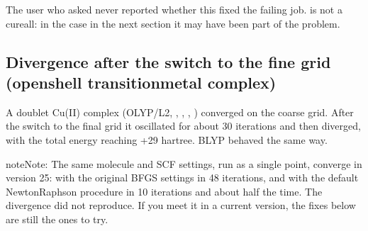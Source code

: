 \documentclass[letterpaper,10pt,english,openany,oneside]{sphinxmanual}
\begin{document}
\sphinxAtStartPar
The user who asked never reported whether this fixed the failing job.  is not a cure\sphinxhyphen{}all: in the case in the
next section it may have been part of the problem.




\subsection{Divergence after the switch to the fine grid (open\sphinxhyphen{}shell transition\sphinxhyphen{}metal complex)}
\label{\detokenize{troubleshooting/common-problems:divergence-after-the-switch-to-the-fine-grid-open-shell-transition-metal-complex}}\label{\detokenize{troubleshooting/common-problems:troubleshooting-fine-grid}}
\sphinxAtStartPar
{} A doublet Cu(II) complex (OLYP/L2, , , , )
converged on the coarse grid. After the switch to the final grid it oscillated for about 30 iterations and then
diverged, with the total energy reaching +29 hartree. BLYP behaved the same way.



\begin{sphinxadmonition}{note}{Note:}
\sphinxAtStartPar
The same molecule and SCF settings, run as a single point, converge in version 25: with the original BFGS settings in
48 iterations, and with the default Newton\textendash{}Raphson procedure in 10 iterations and about half the time. The
divergence did not reproduce. If you meet it in a current version, the fixes below are still the ones to try.
\end{sphinxadmonition}
\end{document}
